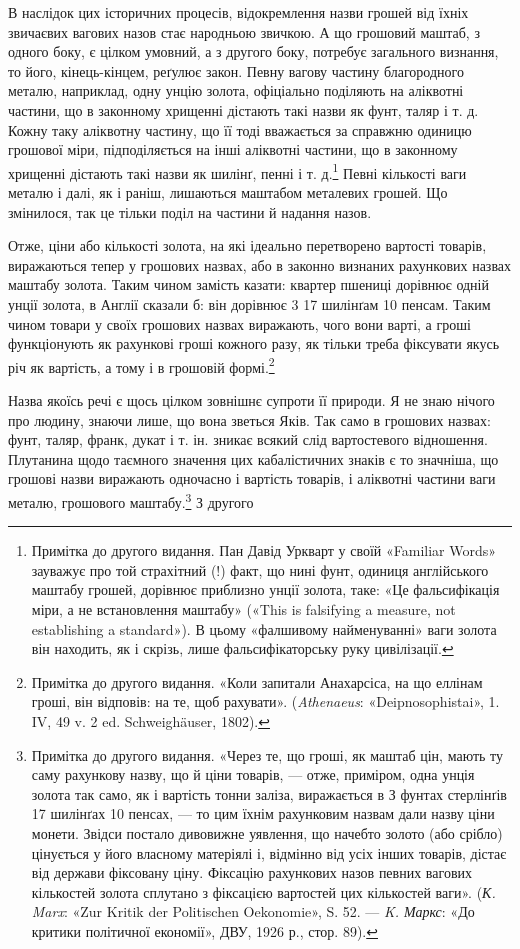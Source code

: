 В наслідок цих історичних процесів, відокремлення назви
грошей від їхніх звичаєвих вагових назов стає народньою звичкою.
А що грошовий маштаб, з одного боку, є цілком умовний,
а з другого боку, потребує загального визнання, то його, кінець-кінцем,
реґулює закон. Певну вагову частину благородного
металю, наприклад, одну унцію золота, офіціально поділяють
на аліквотні частини, що в законному хрищенні дістають
такі назви як фунт, таляр і т. д. Кожну таку аліквотну частину,
що її тоді вважається за справжню одиницю грошової міри, підподіляється
на інші аліквотні частини, що в законному хрищенні
дістають такі назви як шилінґ, пенні і т. д.\footnote{
Примітка до другого видання. Пан Давід Уркварт у своїй «Familiar
Words» зауважує про той страхітний (!) факт, що нині фунт, одиниця
англійського маштабу грошей, дорівнює приблизно  унції золота, таке:
«Це фальсифікація міри, а не встановлення маштабу» («This is falsifying
a measure, not establishing a standard»). В цьому «фалшивому
найменуванні» ваги золота він находить, як і скрізь, лише фальсифікаторську
руку цивілізації.
} Певні кількості ваги
металю і далі, як і раніш, лишаються маштабом металевих грошей.
Що змінилося, так це тільки поділ на частини й надання назов.

Отже, ціни або кількості золота, на які ідеально перетворено
вартості товарів, виражаються тепер у грошових назвах, або в
законно визнаних рахункових назвах маштабу золота. Таким
чином замість казати: квартер пшениці дорівнює одній унції
золота, в Англії сказали б: він дорівнює 3
17 шилінґам 10 пенсам. Таким чином товари у своїх грошових
назвах виражають, чого вони варті, а гроші функціонують як
рахункові гроші кожного разу, як тільки треба фіксувати якусь
річ як вартість, а тому і в грошовій формі.\footnote{
Примітка до другого видання. «Коли запитали Анахарсіса, на що
еллінам гроші, він відповів: на те, щоб рахувати». (\emph{Athenaeus}: «Deipnosophistai»,
1. IV, 49 v. 2 ed. Schweighäuser, 1802).
}

Назва якоїсь речі є щось цілком зовнішнє супроти її природи.
Я не знаю нічого про людину, знаючи лише, що вона зветься
Яків. Так само в грошових назвах: фунт, таляр, франк, дукат
і т. ін. зникає всякий слід вартостевого відношення. Плутанина
щодо таємного значення цих кабалістичних знаків є то значніша,
що грошові назви виражають одночасно і вартість товарів,
і аліквотні частини ваги металю, грошового маштабу.\footnote{
Примітка до другого видання. «Через те, що гроші, як маштаб цін,
мають ту саму рахункову назву, що й ціни товарів, — отже, приміром,
одна унція золота так само, як і вартість тонни заліза, виражається в
З фунтах стерлінґів 17 шилінґах 10 пенсах, — то цим їхнім рахунковим
назвам дали назву ціни монети. Звідси постало дивовижне уявлення, що
начебто золото (або срібло) цінується у його власному матеріялі і, відмінно
від усіх інших товарів, дістає від держави фіксовану ціну. Фіксацію
рахункових назов певних вагових кількостей золота сплутано з
фіксацією вартостей цих кількостей ваги». (\emph{К. Marx}: «Zur Kritik der
Politischen Oekonomie», S. 52. — \emph{K. Маркс}: «До критики політичної
економії», ДВУ, 1926 р., стор. 89).
} З другого
\parbreak{}  %
